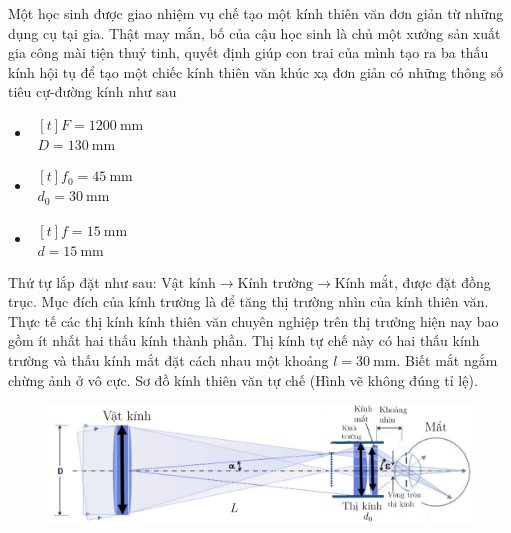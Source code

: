 Một học sinh được giao nhiệm vụ chế tạo một kính thiên văn đơn giản từ những dụng cụ tại gia. Thật may mắn, bố của cậu học sinh là chủ một xưởng sản xuất gia công mài tiện thuỷ tinh, quyết định giúp con trai của mình tạo ra ba thấu kính hội tụ để tạo một chiếc kính thiên văn khúc xạ đơn giản có những thông số tiêu cự-đường kính như sau
\begin{itemize}\itemsep0em
\item {}
     $ \begin{aligned}[t]
      F = 1200 \mathrm{~mm}\\
      D = 130 \mathrm{~mm}
      \end{aligned} $
\item {}
     $ \begin{aligned}[t]
      f_0 = 45 \mathrm{~mm}\\
      d_0 = 30 \mathrm{~mm}
      \end{aligned} $
\item {}
     $ \begin{aligned}[t]
      f= 15 \mathrm{~mm}\\
      d = 15 \mathrm{~mm}
      \end{aligned} $
\end{itemize}

Thứ tự lắp đặt như sau: $\text{Vật kính} \rightarrow \text{Kính trường} \rightarrow \text{Kính mắt}$, được đặt đồng trục. Mục đích của kính trường là để tăng thị trường nhìn của kính thiên văn. Thực tế các thị kính kính thiên văn chuyên nghiệp trên thị trường hiện nay bao gồm ít nhất hai thấu kính thành phần. Thị kính tự chế này có hai thấu kính trường và thấu kính mắt đặt cách nhau một khoảng $l = 30 \mathrm{~mm}$. Biết mắt ngắm chừng ảnh ở vô cực. Sơ đồ kính thiên văn tự chế (Hình vẽ không đúng tỉ lệ).
\begin{figure}[h!]
    \centering
    \includegraphics[scale=0.5]{Problem_4/P4.png}
    \label{fig_P4}
\end{figure}

\vspace{1cm}

